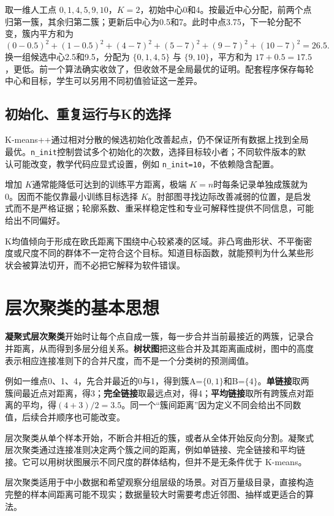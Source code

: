 取一维人工点 $0,1,4,5,9,10$，$K=2$，初始中心0和4。按最近中心分配，前两个点归第一簇，其余归第二簇；更新后中心为0.5和7。此时中点3.75，下一轮分配不变，簇内平方和为
\[
(0-0.5)^2+(1-0.5)^2+(4-7)^2+(5-7)^2+(9-7)^2+(10-7)^2=26.5.
\]
换一组候选中心2.5和9.5，分配为 $\{0,1,4,5\}$ 与 $\{9,10\}$，平方和为 $17+0.5=17.5$，更低。前一个算法确实收敛了，但收敛不是全局最优的证明。配套程序保存每轮中心和目标，学生可以另用不同初值验证这一差异。

\subsection{初始化、重复运行与K的选择}
K-means++通过相对分散的候选初始化改善起点，仍不保证所有数据上找到全局最优。\texttt{n\_init}控制尝试多个初始化的次数，选择目标较小者；不同软件版本的默认可能改变，教学代码应显式设置，例如 \texttt{n\_init=10}，不依赖隐含配置。

增加 $K$通常能降低可达到的训练平方距离，极端 $K=n$时每条记录单独成簇就为0。因而不能仅靠最小训练目标选择 $K$。肘部图寻找边际改善减弱的位置，是启发式而不是严格证据；轮廓系数、重采样稳定性和专业可解释性提供不同信息，可能给出不同偏好。

K均值倾向于形成在欧氏距离下围绕中心较紧凑的区域。非凸弯曲形状、不平衡密度或尺度不同的群体不一定符合这个目标。知道目标函数，就能预判为什么某些形状会被算法切开，而不必把它解释为软件错误。

\section{层次聚类的基本思想}

\textbf{凝聚式层次聚类}开始时让每个点自成一簇，每一步合并当前最接近的两簇，记录合并距离，从而得到多层分组关系。\textbf{树状图}把这些合并及其距离画成树，图中的高度表示相应连接准则下的合并尺度，而不是一个分类树的预测阈值。

例如一维点0、1、4，先合并最近的0与1，得到簇A=$\{0,1\}$和B=$\{4\}$。\textbf{单链接}取两簇间最近点对距离，得3；\textbf{完全链接}取最远点对，得4；\textbf{平均链接}取所有跨簇点对距离的平均，得$(4+3)/2=3.5$。同一个“簇间距离”因为定义不同会给出不同数值，后续合并顺序也可能改变。

层次聚类从单个样本开始，不断合并相近的簇，或者从全体开始反向分割。凝聚式层次聚类通过连接准则决定两个簇之间的距离，例如单链接、完全链接和平均链接。它可以用树状图展示不同尺度的群体结构，但并不是无条件优于 K-means。

层次聚类适用于中小数据和希望观察分组层级的场景。对百万量级目录，直接构造完整的样本间距离可能不现实；数据量较大时需要考虑近邻图、抽样或更适合的算法。

